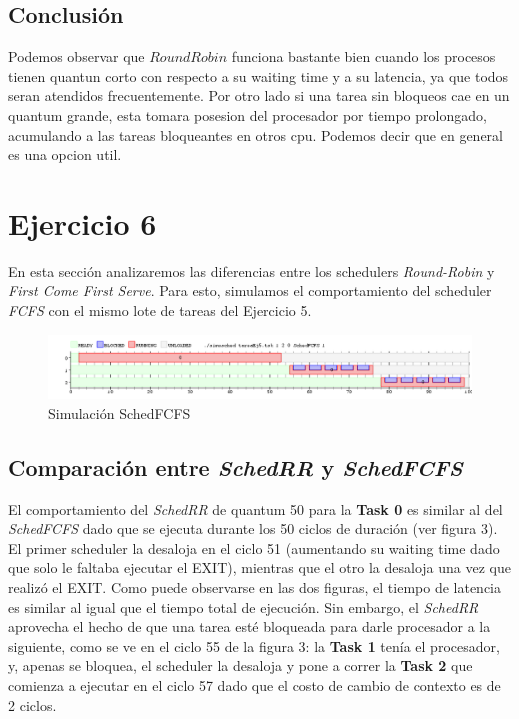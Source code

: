 \documentclass[11pt]{article}
\begin{document}
\subsection{Conclusión}
Podemos observar que $Round Robin$ funciona bastante bien cuando los procesos tienen quantun corto con respecto a su waiting time y a su latencia, ya que todos seran atendidos frecuentemente. Por otro lado si una tarea sin bloqueos cae en un quantum grande, esta tomara posesion del procesador por tiempo prolongado, acumulando a las tareas bloqueantes en otros cpu. Podemos decir que en general es una opcion util.

\newpage

\section{Ejercicio 6}

En esta sección analizaremos las diferencias entre los schedulers \textit{Round-Robin} y \textit{First Come First Serve}. Para esto, simulamos el comportamiento del scheduler \textit{FCFS} con el mismo lote de tareas del Ejercicio 5.

      \begin{figure}[H]
        \includegraphics[scale=0.5]{Ej6}
        \caption{Simulación SchedFCFS}
      \end{figure}

\subsection{Comparación entre \textit{SchedRR} y \textit{SchedFCFS}}

El comportamiento del \textit{SchedRR} de quantum 50 para la \textbf{Task 0} es similar al del \textit{SchedFCFS} dado que se ejecuta durante los 50 ciclos de duración (ver figura 3). El primer scheduler la desaloja en el ciclo 51 (aumentando su waiting time dado que solo le faltaba ejecutar el EXIT), mientras que el otro la desaloja una vez que realizó el EXIT. Como puede observarse en las dos figuras, el tiempo de latencia es similar al igual que el tiempo total de ejecución. Sin embargo, el \textit{SchedRR} aprovecha el hecho de que una tarea esté bloqueada para darle procesador a la siguiente, como se ve en el ciclo 55 de la figura 3: la \textbf{Task 1} tenía el procesador, y, apenas se bloquea, el scheduler la desaloja y pone a correr la \textbf{Task 2} que comienza a ejecutar en el ciclo 57 dado que el costo de cambio de contexto es de 2 ciclos. \\
\end{document}

